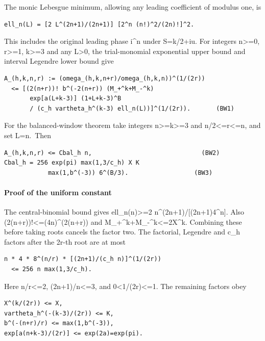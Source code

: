 The monic Lebesgue minimum, allowing any leading coefficient of modulus one, is

\begin{verbatim}
ell_n(L) = [2 L^(2n+1)/(2n+1)] [2^n (n!)^2/(2n)!]^2.
\end{verbatim}

This includes the original leading phase i\^{}n under S=k/2+iu. For integers n\textgreater=0, r\textgreater=1, k\textgreater=3 and any L\textgreater0, the trial-monomial exponential upper bound and interval Legendre lower bound give

\begin{verbatim}
A_(h,k,n,r) := (omega_(h,k,n+r)/omega_(h,k,n))^(1/(2r))
  <= [(2(n+r))! b^(-2(n+r)) (M_+^k+M_-^k)
       exp[a(L+k-3)] (1+L+k-3)^B
       / (c_h vartheta_h^(k-3) ell_n(L))]^(1/(2r)).       (BW1)
\end{verbatim}

For the balanced-window theorem take integers n\textgreater=k\textgreater=3 and n/2\textless=r\textless=n, and set L=n.~Then

\begin{verbatim}
A_(h,k,n,r) <= Cbal_h n,                              (BW2)
Cbal_h = 256 exp(pi) max(1,3/c_h) X K
            max(1,b^(-3)) 6^(B/3).                  (BW3)
\end{verbatim}

\paragraph{Proof of the uniform constant}\label{endpoint-balanced_window--proof-of-the-uniform-constant}

The central-binomial bound gives ell\_n(n)\textgreater=2 n\^{}(2n+1)/{[}(2n+1)4\^{}n{]}. Also (2(n+r))!\textless=(4n)\^{}(2(n+r)) and M\_+\^{}k+M\_-\^{}k\textless=2X\^{}k. Combining these before taking roots cancels the factor two. The factorial, Legendre and c\_h factors after the 2r-th root are at most

\begin{verbatim}
n * 4 * 8^(n/r) * [(2n+1)/(c_h n)]^(1/(2r))
  <= 256 n max(1,3/c_h).
\end{verbatim}

Here n/r\textless=2, (2n+1)/n\textless=3, and 0\textless1/(2r)\textless=1. The remaining factors obey

\begin{verbatim}
X^(k/(2r)) <= X,
vartheta_h^(-(k-3)/(2r)) <= K,
b^(-(n+r)/r) <= max(1,b^(-3)),
exp[a(n+k-3)/(2r)] <= exp(2a)=exp(pi).
\end{verbatim}

